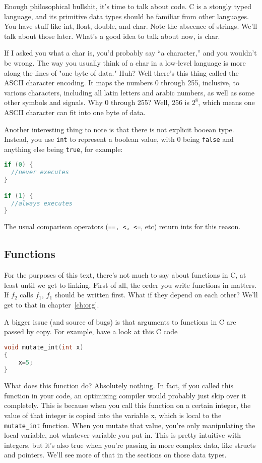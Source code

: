 \documentclass[ebook,11pt,oneside,openany]{memoir}
\newcommand{\cf}[1]{\texttt{#1}}
\begin{document}
Enough philosophical bullshit, it's time to talk about code. C is a stongly typed language, and its primitive data types should be familiar from other languages. You have stuff like int, float, double, and char. Note the abscence of strings. We'll talk about those later. What's a good idea to talk about now, is char. 

If I asked you what a char is, you'd probably say ``a character,'' and you wouldn't be wrong. The way you usually think of a char in a low-level language is more along the lines of "one byte of data." Huh? Well there's this thing called the ASCII character encoding. It maps the numbers 0 through 255, inclusive, to various characters, including all latin letters and arabic numbers, as well as some other symbols and signals. Why 0 through 255? Well, 256 is $2^8$, which means one ASCII character can fit into one byte of data.

Another interesting thing to note is that there is not explicit booean type. Instead, you use \texttt{int} to represent a boolean value, with 0 being \texttt{false} and anything else being \texttt{true}, for example:

\begin{lstlisting}[language=C]
if (0) {
  //never executes
}

if (1) {
  //always executes
}
\end{lstlisting}

The usual comparison operators (\texttt{==, <, <=}, etc) return ints for this reason.

\subsection{Functions}
For the purposes of this text, there's not much to say about functions in C, at least until we get to linking. First of all, the order you write functions in matters. If $f_2$ calls $f_1$, $f_1$ should be written first. What if they depend on each other? We'll get to that in chapter~\ref{ch:org}.

A bigger issue (and source of bugs) is that arguments to functions in C are passed by copy. For example, have a look at this C code

\begin{lstlisting}[language=C]
void mutate_int(int x)
{
	x=5;
}
\end{lstlisting}

What does this function do? Absolutely nothing. In fact, if you called this function in your code, an optimizing compiler would probably just skip over it completely. This is because when you call this function on a certain integer, the value of that integer is copied into the variable x, which is local to the \cf{mutate\_int} function. When you mutate that value, you're only manipulating the local variable, not whatever variable you put in. This is pretty intuitive with integers, but it's also true when you're passing in more complex data, like structs and pointers. We'll see more of that in the sections on those data types.
\end{document}
